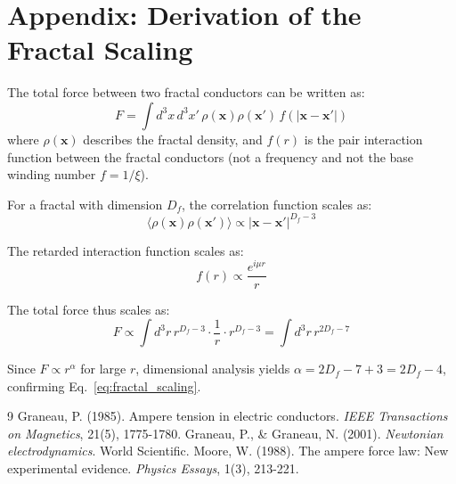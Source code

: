 	\section*{Appendix: Derivation of the Fractal Scaling}
	The total force between two fractal conductors can be written as:
	\begin{equation}
		F = \int d^3x \, d^3x' \, \rho(\mathbf{x}) \rho(\mathbf{x}') \, f(|\mathbf{x}-\mathbf{x}'|)
	\end{equation}
	where $\rho(\mathbf{x})$ describes the fractal density, and $f(r)$ is the pair interaction function between the fractal conductors (not a frequency and not the base winding number $f = 1/\xi$).

	For a fractal with dimension $D_f$, the correlation function scales as:
	\begin{equation}
		\langle \rho(\mathbf{x}) \rho(\mathbf{x}')\rangle \propto |\mathbf{x}-\mathbf{x}'|^{D_f - 3}
	\end{equation}
	
	The retarded interaction function scales as:
	\begin{equation}
		f(r) \propto \frac{e^{i\mu r}}{r}
	\end{equation}
	
	The total force thus scales as:
	\begin{equation}
		F \propto \int d^3r \, r^{D_f - 3} \cdot \frac{1}{r} \cdot r^{D_f - 3} = \int d^3r \, r^{2D_f - 7}
	\end{equation}
	
	Since $F \propto r^{\alpha}$ for large $r$, dimensional analysis yields $\alpha = 2D_f - 7 + 3 = 2D_f - 4$, confirming Eq.~\ref{eq:fractal_scaling}.
	
	\begin{thebibliography}{9}
		 Graneau, P. (1985). Ampere tension in electric conductors. \textit{IEEE Transactions on Magnetics}, 21(5), 1775-1780.
		 Graneau, P., \& Graneau, N. (2001). \textit{Newtonian electrodynamics}. World Scientific.
		 Moore, W. (1988). The ampere force law: New experimental evidence. \textit{Physics Essays}, 1(3), 213-221.
	\end{thebibliography}
